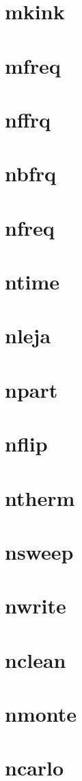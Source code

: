 \documentclass[10pt]{book}
\begin{document}
\section{mkink}
\section{mfreq}
\section{nffrq}
\section{nbfrq}
\section{nfreq}
\section{ntime}
\section{nleja}
\section{npart}
\section{nflip}
\section{ntherm}
\section{nsweep}
\section{nwrite}
\section{nclean}
\section{nmonte}
\section{ncarlo}
\end{document}
